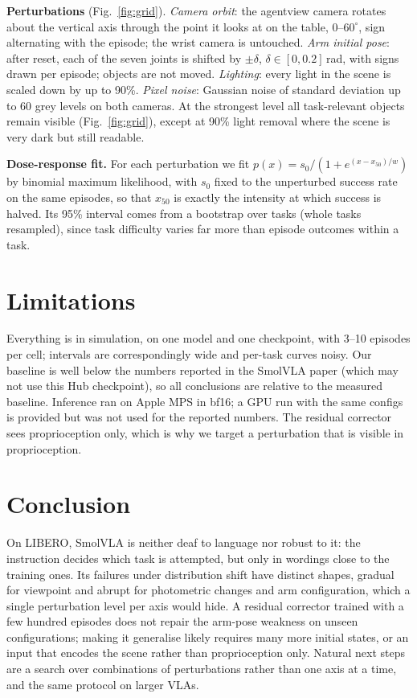 \textbf{Perturbations} (Fig.~\ref{fig:grid}). \emph{Camera orbit}: the agentview camera rotates about the
vertical axis through the point it looks at on the table, $0$--$60^\circ$, sign alternating with the
episode; the wrist camera is untouched. \emph{Arm initial pose}: after reset, each of the seven joints
is shifted by $\pm\delta$, $\delta\in[0,0.2]$\,rad, with signs drawn per episode; objects are not moved.
\emph{Lighting}: every light in the scene is scaled down by up to 90\%. \emph{Pixel noise}: Gaussian noise
of standard deviation up to 60 grey levels on both cameras. At the strongest level all task-relevant
objects remain visible (Fig.~\ref{fig:grid}), except at 90\% light removal where the scene is very dark
but still readable.

\textbf{Dose-response fit.} For each perturbation we fit
$p(x) = s_0 / (1 + e^{(x - x_{50})/w})$ by binomial maximum likelihood, with $s_0$ fixed to the
unperturbed success rate on the same episodes, so that $x_{50}$ is exactly the intensity at which
success is halved. Its 95\% interval comes from a bootstrap over tasks (whole tasks resampled), since
task difficulty varies far more than episode outcomes within a task.



\section{Limitations}
Everything is in simulation, on one model and one checkpoint, with 3--10 episodes per cell; intervals are
correspondingly wide and per-task curves noisy. Our baseline is well below the numbers reported in the
SmolVLA paper (which may not use this Hub checkpoint), so all conclusions are relative to the measured
baseline. Inference ran on Apple MPS in bf16; a GPU run with the same configs is provided but was not used
for the reported numbers. The residual corrector sees proprioception only, which is why we target a
perturbation that is visible in proprioception.

\section{Conclusion}
On LIBERO, SmolVLA is neither deaf to language nor robust to it: the instruction decides which task is
attempted, but only in wordings close to the training ones. Its failures under distribution shift have
distinct shapes, gradual for viewpoint and abrupt for photometric changes and arm configuration,
which a single perturbation level per axis would hide. A residual corrector trained with a few hundred
episodes does not repair the arm-pose weakness on unseen configurations; making it generalise likely
requires many more initial states, or an input that encodes the scene rather than proprioception only.
Natural next steps are a search over combinations of perturbations rather than one axis at a time, and
the same protocol on larger VLAs.
